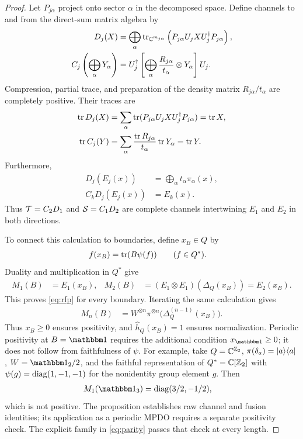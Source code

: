 \documentclass[aps,pra,reprint,nofootinbib,onecolumn]{revtex4-2}
\begin{document}
\begin{proof}
	Let $P_{j\alpha}$ project onto sector $\alpha$ in the decomposed
	space. Define channels to and from the direct-sum matrix algebra by
	\begin{align}
		D_j(X)
		 & =\bigoplus_\alpha
		\operatorname{tr}_{\mathbb{C}^{m_{j\alpha}}}
		\left(P_{j\alpha}U_jXU_j^\dagger P_{j\alpha}\right),
		\\
		C_j\left(\bigoplus_\alpha Y_\alpha\right)
		 & =U_j^\dagger
		\left[\bigoplus_\alpha
			\frac{R_{j\alpha}}{t_\alpha}\otimes Y_\alpha\right]U_j.
		\label{eq:generalchannels}
	\end{align}
	Compression, partial trace, and preparation of the density matrix
	$R_{j\alpha}/t_\alpha$ are completely positive. Their traces are
	\begin{align}
		\operatorname{tr} D_j(X)
		 & =\sum_\alpha\operatorname{tr}(P_{j\alpha}U_jXU_j^\dagger P_{j\alpha})
		=\operatorname{tr} X,
		\\
		\operatorname{tr} C_j(Y)
		 & =\sum_\alpha\frac{\operatorname{tr} R_{j\alpha}}{t_\alpha}\operatorname{tr} Y_\alpha
		=\operatorname{tr} Y.
	\end{align}
	Furthermore,
	\begin{align}
		D_j(E_j(x))    & =\bigoplus_\alpha t_\alpha\pi_\alpha(x),
		\\
		C_kD_j(E_j(x)) & =E_k(x).
	\end{align}
	Thus $\mathcal{T}=C_2D_1$ and $\mathcal{S}=C_1D_2$ are complete channels
	intertwining $E_1$ and $E_2$ in both directions.

	To connect this calculation to boundaries, define $x_B\in Q$ by
	\begin{align}
		f(x_B) & =\operatorname{tr}(B\psi(f))
		\qquad(f\in Q^*).
	\end{align}
	Duality and multiplication in $Q^*$ give
	\begin{align}
		M_1(B) & =E_1(x_B),
		       &
		M_2(B) & =(E_1\otimes E_1)(\Delta_Q(x_B))=E_2(x_B).
	\end{align}
	This proves \cref{eq:rfp} for every boundary. Iterating the same
	calculation gives
	\begin{align}
		M_n(B) & =W^{\otimes n}\pi^{\otimes n}
		\bigl(\Delta_Q^{(n-1)}(x_B)\bigr).
		\label{eq:boundary-positivity}
	\end{align}
	Thus $x_B\geq0$ ensures positivity, and
	$\hat h_Q(x_B)=1$ ensures normalization. Periodic positivity at
	$B=\Id$ requires the additional condition $x_{\Id}\geq0$; it does
	not follow from faithfulness of $\psi$.
	For example, take $Q=\mathbb{C}^{\mathbb{Z}_2}$,
	$\pi(\delta_a)=\lvert a\rangle\langle a\rvert$, $W=\Id_2/2$, and the faithful
	representation of $Q^*=\mathbb{C}[\mathbb{Z}_2]$ with
	$\psi(g)=\operatorname{diag}(1,-1,-1)$ for the nonidentity group element $g$.
	Then
	\begin{align}
		M_1(\Id_3) & =\diag(3/2,-1/2),
	\end{align}
	which is not positive. The proposition establishes raw channel and
	fusion identities; its application as a periodic MPDO requires a
	separate positivity check. The explicit family in
	\cref{eq:parity} passes that check at every length.


\end{proof}
\end{document}
